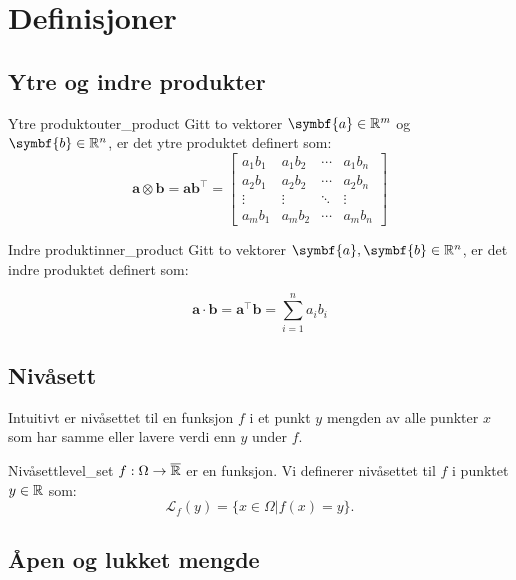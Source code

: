 \chapter{Definisjoner}

\section{Ytre og indre produkter}
\begin{definition}{Ytre produkt}{outer_product}
  Gitt to vektorer \( \symbf{a} \in \R^m \) og \( \symbf{b} \in \R^n \), er det ytre produktet definert som:
  \[
    \symbf{a} \otimes \symbf{b} = \symbf{a} \symbf{b}^\top =
    \begin{bmatrix}
      a_1b_1 & a_1b_2 & \cdots & a_1b_n \\
      a_2b_1 & a_2b_2 & \cdots & a_2b_n \\
      \vdots & \vdots & \ddots & \vdots \\
      a_mb_1 & a_mb_2 & \cdots & a_mb_n
    \end{bmatrix}
  \]
\end{definition}

\begin{definition}{Indre produkt}{inner_product}
  Gitt to vektorer \( \symbf{a}, \symbf{b} \in \R^n \), er det indre produktet definert som:

  \[
    \symbf{a} \cdot \symbf{b} = \symbf{a}^\top \symbf{b} = \sum_{i=1}^{n} a_i b_i
  \]

\end{definition}



\section{Nivåsett}
Intuitivt er nivåsettet til en funksjon \( f \) i et punkt \( y \) mengden av alle punkter \( x \) som har samme eller lavere verdi enn \( y \) under \( f \).
\begin{definition}{Nivåsett}{level_set}
  \(f: \Omega \to \overline{\mathbb{R}}\) er en funksjon. Vi definerer nivåsettet til \(f\) i punktet \(y \in \mathbb{R}\) som:
  \[
    \mathcal{L}_f(y) = \{x \in \Omega | f(x) = y\}.
  \]
\end{definition}

\section{Åpen og lukket mengde}

